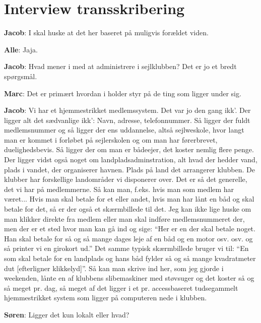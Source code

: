 \chapter{Interview transskribering}\label{bilag:interview-transkribering}
\textbf{Jacob}: I skal huske at det her baseret på muligvis forældet viden.

\textbf{Alle}: Jaja.

\textbf{Jacob}: Hvad mener i med at administrere i sejlklubben? Det er jo et bredt spørgsmål.

\textbf{Marc}: Det er primært hvordan i holder styr på de ting som ligger under sig.

\textbf{Jacob}: Vi har et hjemmestrikket medlemssystem. Det var jo den gang ikk'. Der ligger alt det sædvanlige ikk': Navn, adresse, telefonnummer. Så ligger der fuldt medlemsnummer og så ligger der ens uddannelse, altså sejlweskole, hvor langt man er kommet i forløbet på sejlerskolen og om man har førerbrevet, duelighedsbevis. Så ligger der om man er bådeejer, det koster nemlig flere penge. Der ligger vidst også noget om landpladsadminstration, alt hvad der hedder vand, plads i vandet, der organiserer havnen. Plads på land det arrangerer klubben. De klubber har forskellige landområder vi disponerer over. Det er så det generelle, det vi har på medlemmerne.
Så kan man, f.eks. hvis man som medlem har været... Hvis man skal betale for et eller andet, hvis man har lånt en båd og skal betale for det, så er der også et skærmbillede til det. Jeg kan ikke lige huske om man klikker direkte fra medlem eller man skal indføre medlemsnummeret der, men der er et sted hvor man kan gå ind og sige: ``Her er en der skal betale noget. Han skal betale for så og så mange dages leje af en båd og en motor osv. osv. og så printer vi en girokort ud.'' Det samme typisk skærmbillede bruger vi til: ``En som skal betale for en landplads og hans båd fylder så og så mange kvadratmeter dut [efterligner klikkelyd]''. Så kan man skrive ind her, som jeg gjorde i weekenden, lånte en af klubbens slibemaskiner med støvsuger og det koster så og så meget pr. dag, så meget af det ligger i et pr. accessbaseret tudsegammelt hjemmestrikket system som ligger på computeren nede i klubben.

\textbf{Søren}: Ligger det kun lokalt eller hvad?

